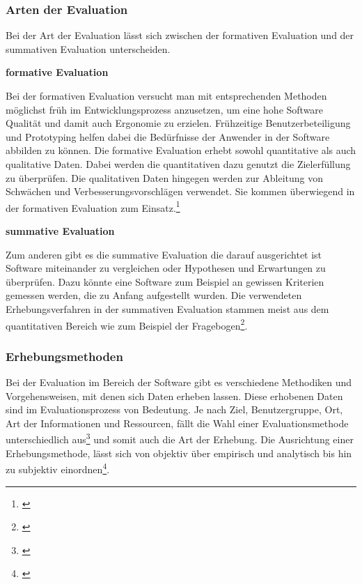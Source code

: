 \subsubsection{Arten der Evaluation}
Bei der Art der Evaluation lässt sich zwischen der formativen Evaluation und der summativen Evaluation unterscheiden.

\textbf{formative Evaluation}

Bei der formativen Evaluation versucht man mit entsprechenden Methoden möglichst früh im Entwicklungsprozess anzusetzen, um eine hohe Software Qualität und damit auch Ergonomie zu erzielen. Frühzeitige Benutzerbeteiligung und Prototyping helfen dabei die Bedürfnisse der Anwender in der Software abbilden zu können. Die formative Evaluation erhebt sowohl quantitative als auch qualitative Daten. Dabei werden die quantitativen dazu genutzt die Zielerfüllung zu überprüfen. Die qualitativen Daten hingegen werden zur Ableitung von Schwächen und Verbesserungsvorschlägen verwendet. Sie kommen überwiegend in der formativen Evaluation zum Einsatz.\footnote{\cite[vgl.][7]{Hegner2003}}

\textbf{summative Evaluation}

Zum anderen gibt es die summative Evaluation die darauf ausgerichtet ist Software miteinander zu vergleichen oder Hypothesen und Erwartungen zu überprüfen. Dazu könnte eine Software zum Beispiel an gewissen Kriterien gemessen werden, die zu Anfang aufgestellt wurden. Die verwendeten Erhebungsverfahren in der summativen Evaluation stammen meist aus dem quantitativen Bereich wie zum Beispiel der Fragebogen\footnote{\cite[vgl.][8]{Hegner2003}}.


\subsubsection{Erhebungsmethoden}
\label{sec:erhebungsmethoden}
Bei der Evaluation im Bereich der Software gibt es verschiedene Methodiken und Vorgehensweisen, mit denen sich Daten erheben lassen. Diese erhobenen Daten sind im Evaluationsprozess von Bedeutung. Je nach Ziel, Benutzergruppe, Ort, Art der Informationen und Ressourcen, fällt die Wahl einer Evaluationsmethode unterschiedlich aus\footnote{\cite[vgl.][10]{Hegner2003}} und somit auch die Art der Erhebung. Die Ausrichtung einer Erhebungsmethode, lässt sich von objektiv über empirisch und analytisch bis hin zu subjektiv einordnen\footnote{\cite[vgl.][15]{Hegner2003}}.

